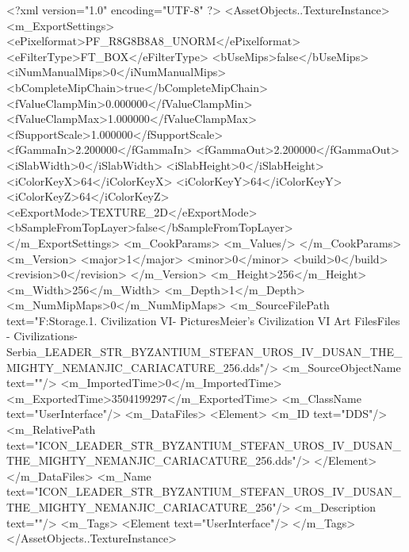 <?xml version="1.0" encoding="UTF-8" ?>
<AssetObjects..TextureInstance>
	<m_ExportSettings>
		<ePixelformat>PF_R8G8B8A8_UNORM</ePixelformat>
		<eFilterType>FT_BOX</eFilterType>
		<bUseMips>false</bUseMips>
		<iNumManualMips>0</iNumManualMips>
		<bCompleteMipChain>true</bCompleteMipChain>
		<fValueClampMin>0.000000</fValueClampMin>
		<fValueClampMax>1.000000</fValueClampMax>
		<fSupportScale>1.000000</fSupportScale>
		<fGammaIn>2.200000</fGammaIn>
		<fGammaOut>2.200000</fGammaOut>
		<iSlabWidth>0</iSlabWidth>
		<iSlabHeight>0</iSlabHeight>
		<iColorKeyX>64</iColorKeyX>
		<iColorKeyY>64</iColorKeyY>
		<iColorKeyZ>64</iColorKeyZ>
		<eExportMode>TEXTURE_2D</eExportMode>
		<bSampleFromTopLayer>false</bSampleFromTopLayer>
	</m_ExportSettings>
	<m_CookParams>
		<m_Values/>
	</m_CookParams>
	<m_Version>
		<major>1</major>
		<minor>0</minor>
		<build>0</build>
		<revision>0</revision>
	</m_Version>
	<m_Height>256</m_Height>
	<m_Width>256</m_Width>
	<m_Depth>1</m_Depth>
	<m_NumMipMaps>0</m_NumMipMaps>
	<m_SourceFilePath text="F:\Mod Storage\2.1. Civilization VI\Mods\Archive - Pictures\Sid Meier's Civilization VI Art Files\Art Files - Civilizations\Civilization - Serbia\ICON_LEADER_STR_BYZANTIUM_STEFAN_UROS_IV_DUSAN_THE_MIGHTY_NEMANJIC_CARIACATURE_256.dds"/>
	<m_SourceObjectName text=""/>
	<m_ImportedTime>0</m_ImportedTime>
	<m_ExportedTime>3504199297</m_ExportedTime>
	<m_ClassName text="UserInterface"/>
	<m_DataFiles>
		<Element>
			<m_ID text="DDS"/>
			<m_RelativePath text="ICON_LEADER_STR_BYZANTIUM_STEFAN_UROS_IV_DUSAN_THE_MIGHTY_NEMANJIC_CARIACATURE_256.dds"/>
		</Element>
	</m_DataFiles>
	<m_Name text="ICON_LEADER_STR_BYZANTIUM_STEFAN_UROS_IV_DUSAN_THE_MIGHTY_NEMANJIC_CARIACATURE_256"/>
	<m_Description text=""/>
	<m_Tags>
		<Element text="UserInterface"/>
	</m_Tags>
</AssetObjects..TextureInstance>

